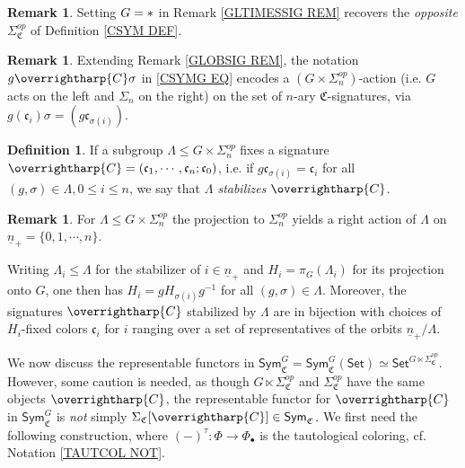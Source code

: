 \documentclass[a4paper,10pt
 ,final
]{article}%
\numberwithin{equation}{section}
\numberwithin{figure}{section}
\theoremstyle{definition} %
\newtheorem{definition}[equation]{Definition}%
\newtheorem{remark}[equation]{Remark}%
\newcommand{\vect}[1]{\text{\overrightharp{\ensuremath{#1}}}}
\newcommand{\1}{\ensuremath{\mathbbm 1}}%
\begin{document}
\begin{remark}
	Setting $G=\**$ in Remark \ref{GLTIMESSIG REM}
	recovers the \emph{opposite} 
	$\Sigma_{\mathfrak{C}}^{op}$ of 
	Definition \ref{CSYM DEF}.
\end{remark}


\begin{remark}\label{SIGACT REM}
	Extending Remark \ref{GLOBSIG REM}, 
	the notation $g \vect{C} \sigma$ in \eqref{CSYMG EQ}
	encodes a $(G \times \Sigma_n^{op})$-action
	(i.e. $G$ acts on the left and $\Sigma_n$ on the right)
	on the set of $n$-ary $\mathfrak{C}$-signatures,
	via
	$g(\mathfrak{c}_i)\sigma =
	(g\mathfrak{c}_{\sigma(i)})$.
\end{remark}


\begin{definition}\label{STABS DEF}
	If a subgroup $\Lambda \leq G \times \Sigma_n^{op}$
	fixes a signature 
	$\vect{C} = (\mathfrak{c}_1,\cdots,\mathfrak{c}_n;\mathfrak{c}_0)$,
	i.e. if
	$g\mathfrak{c}_{\sigma(i)} = \mathfrak{c}_i$
	for all $(g, \sigma) \in \Lambda, 0 \leq i \leq n$,
	we say that \textit{$\Lambda$ stabilizes $\vect C$}. 
\end{definition}


\begin{remark}\label{CHOOSESIGN REM}
	For $\Lambda \leq G \times \Sigma_n^{op}$ 
	the projection to $\Sigma_n^{op}$ yields a
	right action of $\Lambda$ on 
	$\underline{n}_+ = \{0,1,\cdots,n\}$.
	
	Writing $\Lambda_i\leq \Lambda$ for the stabilizer of $i \in \underline{n}_{+}$ and $H_i = \pi_G(\Lambda_i)$
	for its projection onto $G$,
	one then has $H_i = g H_{\sigma(i)} g^{-1}$ for all
	$(g, \sigma) \in \Lambda$.
%	
	Moreover, the signatures $\vect{C}$  
	stabilized by $\Lambda$ are in bijection with choices of 
	$H_i$-fixed colors $\mathfrak{c}_i$ 
	for $i$ ranging over a set of representatives of
	the orbits $\underline{n}_+ /\Lambda$.
\end{remark}



We now discuss the representable functors in 
$\mathsf{Sym}^G_{\mathfrak{C}} =
\mathsf{Sym}^G_{\mathfrak{C}}(\mathsf{Set}) \simeq 
\mathsf{Set}^{G \ltimes \Sigma^{op}_{\mathfrak{C}}}$.
However, some caution is needed,
as though $G \ltimes \Sigma^{op}_{\mathfrak{C}}$
and $\Sigma^{op}_{\mathfrak{C}}$
have the same objects $\vect{C}$,
the representable functor for $\vect{C}$ in
$\mathsf{Sym}^G_{\mathfrak{C}}$
is \emph{not} simply 
$\Sigma_{\mathfrak{C}}[\vect{C}]
\in \mathsf{Sym}_{\mathfrak{C}}$.
We first need the following construction,
where
$(-)^{\tau}\colon \Phi \to \Phi_{\bullet}$
is the tautological coloring, 
cf. Notation \ref{TAUTCOL NOT}.
\end{document}
